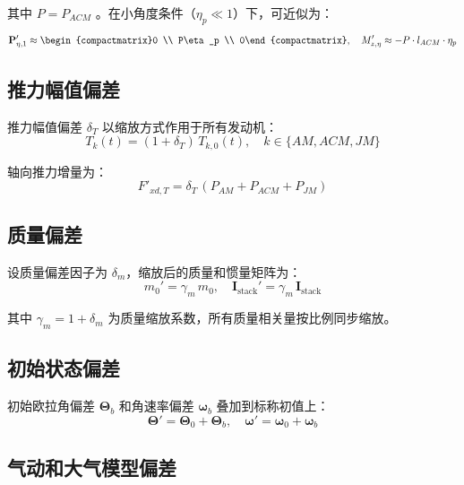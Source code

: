 其中 $P=P_{ACM}$ 。在小角度条件（$\eta_p\ll1$）下，可近似为：
\begin{equation}
\mathbf{P}'_{\eta,1}\approx\begin{compactmatrix}0 \\ P\eta_p \\ 0\end{compactmatrix},\quad
M'_{z,\eta}\approx-P\cdot l_{ACM}\cdot\eta_p 
\end{equation}

\subsection{推力幅值偏差}

推力幅值偏差 $\delta_T$ 以缩放方式作用于所有发动机：
\begin{equation}
T_k(t)=(1+\delta_T)\,T_{k,0}(t),\quad k\in\{AM,ACM,JM\} 
\end{equation}

轴向推力增量为：
\begin{equation}
F'_{xd,T}=\delta_T\,(P_{AM}+P_{ACM}+P_{JM}) 
\end{equation}

\subsection{质量偏差}

设质量偏差因子为 $\delta_m$，缩放后的质量和惯量矩阵为：
\begin{equation}
m_0'=\gamma_m\,m_0,\quad
\mathbf I_{\mathrm{stack}}'=\gamma_m\,\mathbf I_{\mathrm{stack}} 
\end{equation}

其中 $\gamma_m=1+\delta_m$ 为质量缩放系数，所有质量相关量按比例同步缩放。

\subsection{初始状态偏差}

初始欧拉角偏差 $\boldsymbol\Theta_b$ 和角速率偏差 $\boldsymbol\omega_b$ 叠加到标称初值上：
\begin{equation}
\boldsymbol\Theta'=\boldsymbol\Theta_0+\boldsymbol\Theta_b,\quad
\boldsymbol\omega'=\boldsymbol\omega_0+\boldsymbol\omega_b 
\end{equation}

\subsection{气动和大气模型偏差}

